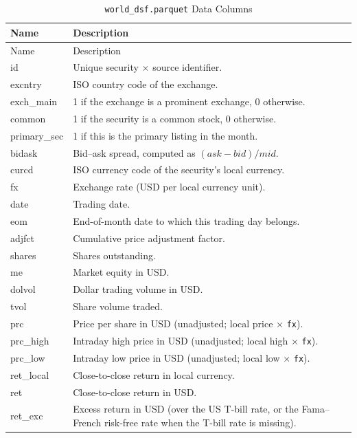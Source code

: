 \documentclass[12pt,title,fleqn]{article}
\begin{document}
{\scriptsize
\begin{longtable}{@{\extracolsep{\fill}}|l|m{14.2cm}|@{}}
\caption{\texttt{world\_dsf.parquet} Data Columns \label{world-dsf-cols}}\\
\hline
Name & Description \\
\hline
\endfirsthead
\hline
Name & Description \\
\hline
\endhead
\hline
\endfoot
\hline\hline
\endlastfoot

id\rule{0pt}{10pt} & Unique security $\times$ source identifier. \\[1ex]
excntry & ISO country code of the exchange. \\[1ex]
exch\_main & 1 if the exchange is a prominent exchange, 0 otherwise. \\[1ex]
common & 1 if the security is a common stock, 0 otherwise. \\[1ex]
primary\_sec & 1 if this is the primary listing in the month. \\[1ex]
bidask & Bid--ask spread, computed as $(\mathit{ask} - \mathit{bid}) / \mathit{mid}$. \\[1ex]
curcd & ISO currency code of the security's local currency. \\[1ex]
fx & Exchange rate (USD per local currency unit). \\[1ex]
date & Trading date. \\[1ex]
eom & End-of-month date to which this trading day belongs. \\[1ex]
adjfct & Cumulative price adjustment factor. \\[1ex]
shares & Shares outstanding. \\[1ex]
me & Market equity in USD. \\[1ex]
dolvol & Dollar trading volume in USD. \\[1ex]
tvol & Share volume traded. \\[1ex]
prc & Price per share in USD (unadjusted; local price $\times$ \texttt{fx}). \\[1ex]
prc\_high & Intraday high price in USD (unadjusted; local high $\times$ \texttt{fx}). \\[1ex]
prc\_low & Intraday low price in USD (unadjusted; local low $\times$ \texttt{fx}). \\[1ex]
ret\_local & Close-to-close return in local currency. \\[1ex]
ret & Close-to-close return in USD. \\[1ex]
ret\_exc & Excess return in USD (over the US T-bill rate, or the Fama--French risk-free rate when the T-bill rate is missing). \\[1ex]

\end{longtable}}
\end{document}
